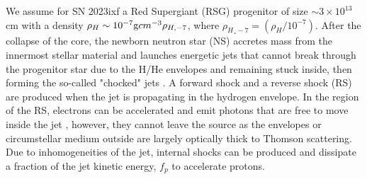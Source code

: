 \documentclass[twocolumn]{aastex631}
\begin{document}
We assume for SN 2023ixf a Red Supergiant (RSG) progenitor of size $\sim 3 \times 10^{13}$ cm 
\citep{Kilpatrick2023,Jencson2023,Hosseinzadeh2023} with a density $\rho_H\sim 10^{-7} {\rm g}{cm}^{-3} \rho_{H,-7}$, where $\rho_{H¸-7}=\left(\rho_H/10^{-7}\right)$\citep{Meszaros2001Jet,He2018,Guetta2020,Fasano2021}. After the collapse of the core, the newborn neutron star (NS) accretes mass from the innermost stellar material and launches energetic jets that cannot break through the progenitor star due to the H/He envelopes and remaining stuck inside, then forming the so-called "chocked" jets \citep{Piran2019,Meszaros2001Jet, Macfadyen2001}. A forward shock and a reverse shock (RS) are produced when the jet is propagating in the hydrogen envelope. In the region of the RS, electrons can be accelerated and emit photons that are free to move inside the jet \citep{Senno2016}, however, they cannot leave the source as the envelopes or circumstellar medium outside are largely optically thick to Thomson scattering. Due to inhomogeneities of the jet, internal shocks can be produced and  dissipate a fraction of the jet kinetic energy, $f_p$ to accelerate protons.
\end{document}
